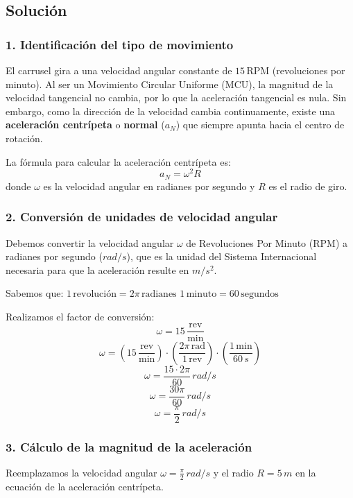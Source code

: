 \documentclass[12pt, a4paper]{article}
\begin{document}
\subsection*{Solución}

\subsubsection*{1. Identificación del tipo de movimiento}
El carrusel gira a una velocidad angular constante de $15 \, \text{RPM}$ (revoluciones por minuto). Al ser un Movimiento Circular Uniforme (MCU), la magnitud de la velocidad tangencial no cambia, por lo que la aceleración tangencial es nula. 
Sin embargo, como la dirección de la velocidad cambia continuamente, existe una \textbf{aceleración centrípeta} o \textbf{normal} ($a_N$) que siempre apunta hacia el centro de rotación.

La fórmula para calcular la aceleración centrípeta es:
$$a_N = \omega^2 R$$
donde $\omega$ es la velocidad angular en radianes por segundo y $R$ es el radio de giro.

\subsubsection*{2. Conversión de unidades de velocidad angular}
Debemos convertir la velocidad angular $\omega$ de Revoluciones Por Minuto (RPM) a radianes por segundo ($\si{rad/s}$), que es la unidad del Sistema Internacional necesaria para que la aceleración resulte en $\si{m/s^2}$.

Sabemos que:
$1 \, \text{revolución} = 2\pi \, \text{radianes}$
$1 \, \text{minuto} = 60 \, \text{segundos}$

Realizamos el factor de conversión:
$$\omega = 15 \, \frac{\text{rev}}{\text{min}}$$
$$\omega = \left( 15 \, \frac{\text{rev}}{\text{min}} \right) \cdot \left( \frac{2\pi \, \text{rad}}{1 \, \text{rev}} \right) \cdot \left( \frac{1 \, \text{min}}{60 \, \si{s}} \right)$$
$$\omega = \frac{15 \cdot 2\pi}{60} \, \si{rad/s}$$
$$\omega = \frac{30\pi}{60} \, \si{rad/s}$$
$$\omega = \frac{\pi}{2} \, \si{rad/s}$$

\subsubsection*{3. Cálculo de la magnitud de la aceleración}
Reemplazamos la velocidad angular $\omega = \frac{\pi}{2} \, \si{rad/s}$ y el radio $R = 5 \, \si{m}$ en la ecuación de la aceleración centrípeta.
\end{document}
